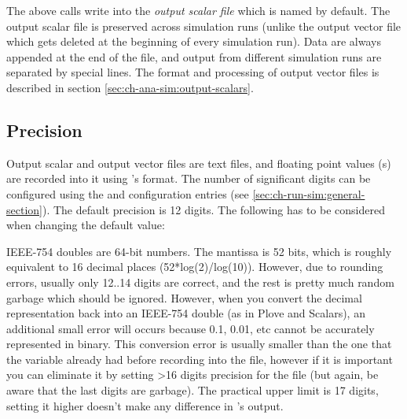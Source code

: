 The above calls write into the \textit{output scalar file} which is named
 by default. The output scalar file is preserved across
simulation runs (unlike the output vector file which gets deleted
at the beginning of every simulation run).
Data are always appended at the end of the file, and
output from different simulation runs are separated by special lines.
The format and processing of output vector files is described in section
\ref{sec:ch-ana-sim:output-scalars}.


\subsection{Precision}
\label{sec:outputfile-precision}

Output scalar and output vector files are text files, and floating point
values (s) are recorded into it using 's
 format.
The number of significant digits can be configured using the
 and 
configuration entries (see \ref{sec:ch-run-sim:general-section}).
The default precision is 12 digits. The following has to be considered
when changing the default value:

IEEE-754 doubles are 64-bit numbers. The mantissa is 52 bits, which
is roughly equivalent to 16 decimal places (52*log(2)/log(10)).
However, due to rounding errors, usually only
12..14 digits are correct, and the rest is pretty much random garbage
which should be ignored. However, when you convert the decimal
representation back into an IEEE-754 double (as in Plove and Scalars),
an additional small error will occurs because 0.1, 0.01, etc cannot be
accurately represented in binary. This conversion error is usually
smaller than the one that the 
variable already had before recording into the file, however if
it is important you can eliminate it by setting >16 digits precision
for the file (but again, be aware that the last digits are garbage).
The practical upper limit is 17 digits, setting it higher
doesn't make any difference in 's output.

%
%
%
%


